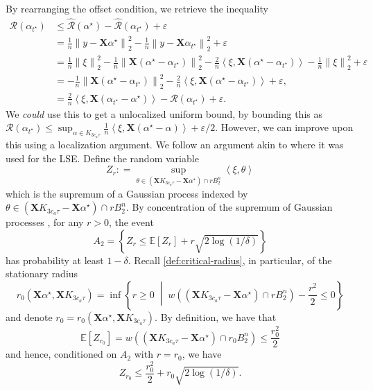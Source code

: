 \documentclass[a4paper]{article}
\newcommand{\mathset}[1]{\left\{#1\right\}}
\newcommand{\pr}[1]{\left(#1\right)}
\newcommand{\br}[1]{\left[#1\right]}
\newcommand{\norm}[1]{\left\|#1\right\|}
\newcommand{\setmid}[0]{\;\middle|\;}
\newcommand{\inner}[2]{\left\langle #1,#2\right\rangle}
\newcommand{\X}[0]{\mathbf{X}}
\newcommand{\EE}[0]{\mathbb{E}}
\newcommand{\cR}[0]{\mathcal{R}}
\newcommand{\eps}[0]{\varepsilon}
\newcommand{\alphastar}{\alpha^\star}
\newcommand{\alphatstar}[0]{\alpha_{t^\star}}
\newcommand{\rzero}[0]{r_{0}}
\newcommand{\Rhat}[0]{\widehat{\cR}}
\theoremstyle{thmstyle}
\theoremstyle{defstyle}
\theoremstyle{remark}
\begin{document}
By rearranging the offset condition, we retrieve the inequality
\begin{align}
    \cR(\alphatstar) &\leq \Rhat(\alphastar)-\Rhat(\alphatstar) + \eps \nonumber\\
    &= \frac{1}{n}\norm{y-\X\alphastar}_2^2-\frac{1}{n}\norm{y-\X\alphatstar}_2^2+\eps \nonumber\\
    &= \frac{1}{n}\norm{\xi}_2^2-\frac{1}{n}\norm{\X(\alphastar-\alphatstar)}_2^2-\frac{2}{n}\inner{\xi}{\X(\alphastar-\alphatstar)} -\frac{1}{n}\norm{\xi}_2^2+\eps \nonumber\\
    &=-\frac{1}{n}\norm{\X(\alphastar-\alphatstar)}_2^2-\frac{2}{n}\inner{\xi}{\X(\alphastar-\alphatstar)}+\eps, \nonumber\\
    &=\frac{2}{n}\inner{\xi}{\X(\alphatstar-\alphastar)}-\cR(\alphatstar)+\eps. \label{eq:basic-inequality}
\end{align}
We \emph{could} use this to get a unlocalized uniform bound, by bounding this as $\cR(\alphatstar)\leq \sup_{\alpha\in K_{3c_a\tau}}\frac{1}{n}\inner{\xi}{\X(\alphastar-\alpha)}+\eps/2$. However, we can improve upon this using a localization argument.
We follow an argument akin to \cite[Theorem 2.3]{Bellec2016sharporacleinequalitiessquares} where it was used for the LSE. 
Define the random variable
\begin{equation*}
    Z_r: = \sup_{\theta\in (\X K_{3c_a\tau}-\X \alphastar)\cap rB_2^n} \inner{\xi}{ \theta}
\end{equation*}
which is the supremum of a Gaussian process indexed by $\theta\in (\X K_{3c_a\tau}-\X \alphastar)\cap rB_2^n$. 
By concentration of the supremum of Gaussian processes \citep[Theorem 5.8]{Boucheron2013concentration}, for any $r>0$, the event
\begin{equation*}
    A_2 =\mathset{Z_r \leq \EE\br{Z_r} +r\sqrt{2\log(1/\delta)}}
\end{equation*}
has probability at least $1-\delta$.
Recall \cref{def:critical-radius}, in particular, of the stationary radius
\begin{equation*}
    \rzero(\X\alphastar,\X K_{3c_a\tau}) = \inf \mathset{r\geq 0 \setmid w\pr{(\X K_{3c_a\tau}-\X \alphastar)\cap rB_2^n}-\frac{r^2}{2} \leq 0}
\end{equation*}
and denote $\rzero= \rzero(\X\alphastar,\X K_{3c_a\tau})$. By definition, we have that
\begin{equation*}
    \EE\br{Z_{\rzero}}= w\pr{(\X K_{3c_a\tau}-\X \alphastar)\cap \rzero B_2^n}\leq \frac{\rzero^2}{2}
\end{equation*}
and hence, conditioned on $A_2$ with $r=\rzero$, we have
\begin{equation*}
    Z_{\rzero}\leq \frac{\rzero^2}{2}+\rzero\sqrt{2\log(1/\delta)}.
\end{equation*}
\end{document}
